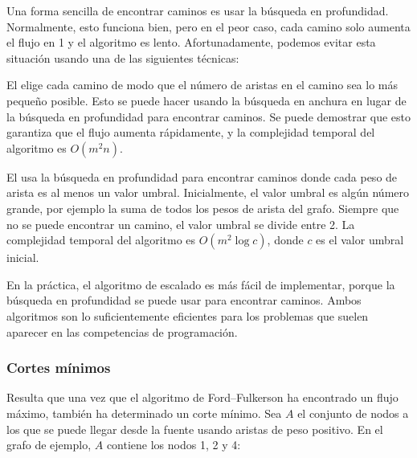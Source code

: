 Una forma sencilla de encontrar caminos es usar la búsqueda en profundidad.
Normalmente, esto funciona bien, pero en el peor caso,
cada camino solo aumenta el flujo en 1
y el algoritmo es lento.
Afortunadamente, podemos evitar esta situación
usando una de las siguientes técnicas:


El  \cite{edm72}
elige cada camino de modo que el número de aristas
en el camino sea lo más pequeño posible.
Esto se puede hacer usando la búsqueda en anchura
en lugar de la búsqueda en profundidad para encontrar caminos.
Se puede demostrar que esto garantiza que
el flujo aumenta rápidamente, y la complejidad temporal
del algoritmo es $O(m^2 n)$.


El  \cite{ahu91} usa la búsqueda en
profundidad para encontrar caminos donde cada peso de arista es
al menos un valor umbral.
Inicialmente, el valor umbral es
algún número grande, por ejemplo la suma de todos los
pesos de arista del grafo.
Siempre que no se puede encontrar un camino,
el valor umbral se divide entre 2.
La complejidad temporal del algoritmo es $O(m^2 \log c)$,
donde $c$ es el valor umbral inicial.

En la práctica, el algoritmo de escalado es más fácil de implementar,
porque la búsqueda en profundidad se puede usar para encontrar caminos.
Ambos algoritmos son lo suficientemente eficientes para los problemas
que suelen aparecer en las competencias de programación.

\subsubsection{Cortes mínimos}


Resulta que una vez que el algoritmo de Ford–Fulkerson
ha encontrado un flujo máximo,
también ha determinado un corte mínimo.
Sea $A$ el conjunto de nodos
a los que se puede llegar desde la fuente
usando aristas de peso positivo.
En el grafo de ejemplo, $A$ contiene los nodos 1, 2 y 4:

